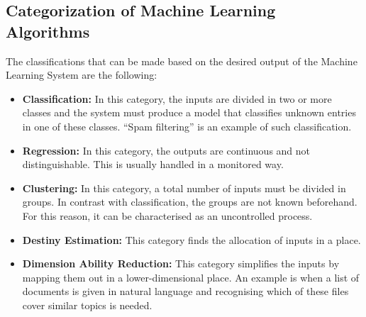 \subsection{Categorization of Machine Learning Algorithms}\label{211_ref}
The classifications that can be made based on the desired output of the Machine Learning System are the following:\\
\begin{itemize}

	\item \textbf{Classification:} In this category, the inputs are divided in two or more classes and the system must produce a model that classifies unknown entries in one of these classes. ``Spam filtering'' is an example of such classification.
	\item \textbf{Regression:} In this category, the outputs are continuous and not distinguishable. This is usually handled in a monitored way.
	\item \textbf{Clustering:} In this category, a total number of inputs must be divided in groups. In contrast with classification, the groups are not known beforehand. For this reason, it can be characterised as an uncontrolled process.
	\item \textbf{Destiny Estimation:} This category finds the allocation of inputs in a place.
	\item \textbf{Dimension Ability Reduction:} This category simplifies the inputs by mapping them out in a lower-dimensional place. An example is when a list of documents is given in natural language and recognising which of these files cover similar topics is needed.\\

\end{itemize}

